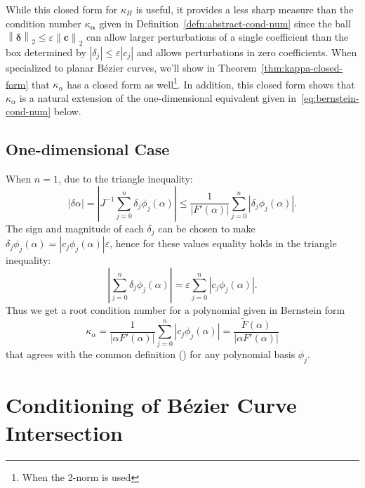 \documentclass[3p, authoryear, square]{elsarticle}
\theoremstyle{definition}
\newcommand{\eps}{\varepsilon}
\begin{document}
While this closed form for \(\kappa_H\) is useful, it provides a less sharp
measure than the condition number \(\kappa_{\bm{\alpha}}\) given in
Definition~\ref{defn:abstract-cond-num} since the ball \(\left \lVert
\bm{\delta} \right \rVert_2 \leq \eps \left \lVert \bm{c} \right \rVert_2\)
can allow larger perturbations of a single coefficient than the box determined
by \(\left|\delta_j\right| \leq \eps \left|c_j\right|\) and allows
perturbations in zero coefficients.
When specialized to planar B\'{e}zier curves, we'll show in
Theorem~\ref{thm:kappa-closed-form} that \(\kappa_{\alpha}\) has a closed form
as well\footnote{When the 2-norm is used}. In addition, this closed
form shows that \(\kappa_{\alpha}\) is a natural extension of the
one-dimensional equivalent given in~\eqref{eq:bernstein-cond-num} below.

\subsection{One-dimensional Case}

When \(n = 1\), due to the triangle inequality:
\begin{equation}\label{eq:tri-ineq}
\left|\delta \alpha\right| = \left|J^{-1} \sum_{j = 0}^n
  \delta_j \phi_j(\alpha)\right| \leq \frac{1}{\left|F'(\alpha)\right|}
  \sum_{j = 0}^n \left|\delta_j \phi_j(\alpha)\right|.
\end{equation}
The sign and magnitude of each \(\delta_j\) can be chosen to make
\(\delta_j \phi_j(\alpha) = \left|c_j \phi_j(\alpha)\right| \eps\),
hence for these values equality holds in the triangle inequality:
\begin{equation}
\left|\sum_{j = 0}^n \delta_j \phi_j(\alpha)\right| =
\eps \sum_{j = 0}^n \left|c_j \phi_j(\alpha)\right|.
\end{equation}
Thus we get a root condition number for a polynomial given in Bernstein form
\begin{equation}\label{eq:bernstein-cond-num}
\kappa_{\alpha} =
  \frac{1}{\left|\alpha F'(\alpha)\right|} \sum_{j = 0}^n \left|
  c_j \phi_j(\alpha)\right| =
  \frac{\widetilde{F}(\alpha)}{\left|\alpha F'(\alpha)\right|}
\end{equation}
that agrees with the common definition
(\cite[Equation~12.33]{Farouki2008}) for any polynomial basis
\(\phi_j\).

\section{Conditioning of B\'{e}zier Curve Intersection}
\end{document}
